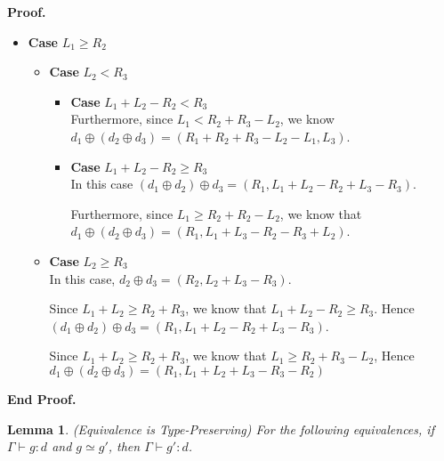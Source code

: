 \documentclass{article}
\newcommand{\judgebalance}[3][\Gamma]{{#1} \vdash {#2} : {#3}}
\newcommand{\combine}[2]{{#1} \oplus {#2}}
\newtheorem{lemma}{Lemma}
\newenvironment{proof}{\noindent\textbf{Proof.}}{\noindent\textbf{End Proof.}}
\newenvironment{caseblock}{\begin{itemize}}{\end{itemize}}
\newenvironment{case}[1]{\item \textbf{Case} {#1}\\}{}
\begin{document}
\begin{proof}
\begin{caseblock}
\begin{case}{$L_1 \geq R_2$}
\begin{caseblock}
\begin{case}{$L_2 < R_3$}
\begin{caseblock}
\begin{case}{$L_1 + L_2 - R_2 < R_3$}
              Furthermore, since $L_1 < R_2 + R_3 - L_2$, we know 
              $\combine{d_1}{(\combine{d_2}{d_3})} = (R_1 + R_2 + R_3 - L_2 - L_1, L_3)$. 
            \end{case}

            \begin{case}{$L_1 + L_2 - R_2 \geq R_3$}
              In this case $\combine{(\combine{d_1}{d_2})}{d_3} = (R_1, L_1 + L_2 - R_2 + L_3 - R_3)$. 

              Furthermore, since $L_1 \geq R_2 + R_2 - L_2$, we know that 
              $\combine{d_1}{(\combine{d_2}{d_3})} = (R_1, L_1 + L_3 - R_2 - R_3 + L_2)$. 
            \end{case}
          \end{caseblock}
        \end{case}

        \begin{case}{$L_2 \geq R_3$}
          In this case, $\combine{d_2}{d_3} = (R_2, L_2 + L_3 - R_3)$. 

          Since $L_1 + L_2 \geq R_2 + R_3$, we know that $L_1 + L_2 - R_2 \geq R_3$. Hence
          $\combine{(\combine{d_1}{d_2})}{d_3} = (R_1, L_1 + L_2 - R_2 + L_3 - R_3)$. 

          Since $L_1 + L_2 \geq R_2 + R_3$, we know that $L_1 \geq R_2 + R_3 - L_2$, Hence
          $\combine{d_1}{(\combine{d_2}{d_3})} = (R_1, L_1 + L_2 + L_3 - R_3 - R_2)$
        \end{case}
      \end{caseblock}
    \end{case}
  \end{caseblock}
\end{proof}



\begin{lemma}{(Equivalence is Type-Preserving)}
For the following equivalences, if $\judgebalance{g}{d}$ and $g \simeq g'$, then $\judgebalance{g'}{d}$.   
\end{lemma}
\end{document}
